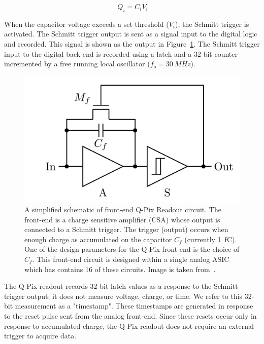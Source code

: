 \begin{equation}~\label{eq:capacitor}
Q_{i} = C_{i}V_{i}
\end{equation}

When the capacitor voltage exceeds a set threshold ($V_{i}$), the Schmitt trigger is activated.
The Schmitt trigger output is sent as a signal input to the digital logic and recorded.
This signal is shown as the output in Figure~\ref{fig:qpixCircuit}.
The Schmitt trigger input to the digital back-end is recorded using a latch and a 32-bit counter incremented by a free running local oscillator ($f_{o} = 30~\unit{MHz}$).

\begin{figure}[]
\centering
\includegraphics[width=\textwidth]{images/qpix_circuit.jpg}
\caption{A simplified schematic of front-end Q-Pix Readout circuit.
The front-end is a charge sensitive amplifier (CSA) whose output is connected to a Schmitt trigger.
The trigger (output) occurs when enough charge as accumulated on the capacitor $C_{f}$ (currently 1~\unit{fC}).
One of the design parameters for the Q-Pix front-end is the choice of $C_{f}$.
This front-end circuit is designed within a single analog ASIC which has contains 16 of these circuits.
Image is taken from~\citep{qpix:nygren:mei}.}
\label{fig:qpixCircuit}
\end{figure}

The Q-Pix readout records 32-bit latch values as a response to the Schmitt trigger output; it does not measure voltage, charge, or time.
We refer to this 32-bit measurement as a "timestamp".
These timestamps are generated in response to the reset pulse sent from the analog front-end.
Since these resets occur only in response to accumulated charge, the Q-Pix readout does not require an external trigger to acquire data.

